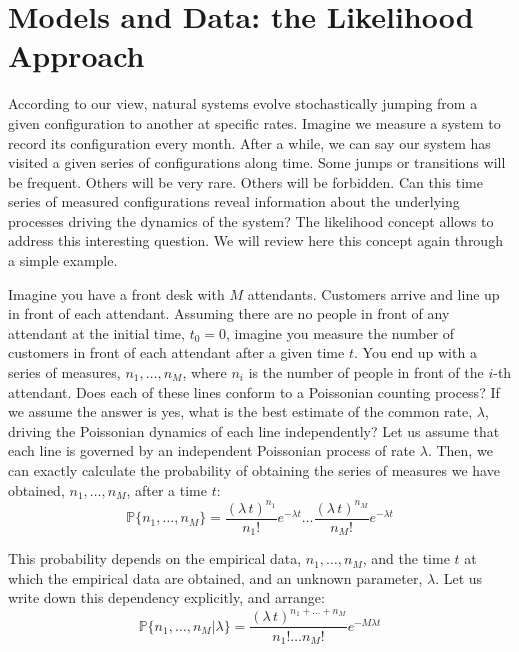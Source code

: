 \documentclass{article}
\newcommand{\Pb}{{\mathbb P}}
\begin{document}
\section{Models and Data: the Likelihood Approach}
According to our view, natural systems evolve stochastically jumping from a given configuration to another at specific rates. Imagine we measure a system to record its configuration every month. After a while, we can say our system has visited a given series of configurations along time. Some jumps or transitions will be frequent. Others will be very rare. Others will be forbidden. Can this time series of measured configurations reveal information about the underlying processes driving the dynamics of the system? The likelihood concept allows to address this interesting question. We will review here this concept again through a simple example.
\smallskip

Imagine you have a front desk with $M$ attendants. Customers arrive and line up in front of each attendant. Assuming there are no people in front of any attendant at the initial time, $t_0 = 0$, imagine you measure the number of customers in front of each attendant after a given time $t$. You end up with a series of measures, $n_1, \dots, n_M$, where $n_i$ is the number of people in front of the $i$-th attendant. Does each of these lines conform to a Poissonian counting process? If we assume the answer is yes, what is the best estimate of the common rate, $\lambda$, driving the Poissonian dynamics of each line independently? Let us assume that each line is governed by an independent Poissonian process of rate $\lambda$. Then, we can exactly calculate the probability of obtaining the series of measures we have obtained, $n_1, \dots, n_M$, after a time $t$:
\begin{equation}
\Pb\{n_1, \dots, n_M\} =  \frac{(\lambda\,t)^{n_1}}{n_1!}e^{-\lambda t}\dots  \frac{(\lambda\,t)^{n_M}}{n_M!}e^{-\lambda t}
\end{equation}

This probability depends on the empirical data, $n_1, \dots, n_M$, and the time $t$ at which the empirical data are obtained, and an unknown parameter, $\lambda$. Let us write down this dependency explicitly, and arrange: 
\begin{equation}
\Pb\{n_1, \dots, n_M | \lambda\} =  \frac{(\lambda\,t)^{n_1+\dots+n_M}}{n_1!\dots n_M!}e^{-M \lambda t}
\label{Lk1}
\end{equation}
\end{document}

